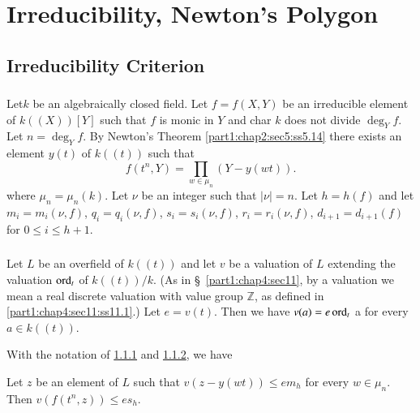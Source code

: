 
\chapter{Irreducibility, Newton's  Polygon}\label{part1:chap5} 

\setcounter{section}{11}
\section{Irreducibility Criterion}\label{part1:chap5:sec12}

\subsection{}\label{part1:chap5:sec12:ss12.1}

Let\pageoriginale $k$ be an algebraically  closed field. Let $f= f(X, Y)$ be an
irreducible element of $k((X))[Y]$ such that $f$ is monic in $Y$ and
char $k$ does not divide $\deg_Y f$. Let $n= \deg_Y f$. By Newton's
Theorem \ref{part1:chap2:sec5:ss5.14} there exists an element $y(t)$
of $k((t))$ such that
$$
f(t^n, Y) = \prod_{w \in \mu_n} (Y- y(wt)).
$$
where $\mu_n= \mu_n (k)$. Let $\nu$ be an integer such that $|\nu|=
n$. Let $h= h(f)$ and let $m_i= m_i(\nu, f)$, $q_i = q_i(\nu, f)$,
$s_i = s_i (\nu, f)$, $r_i = r_i (\nu, f)$, $d_{i+1}= d_{i+1}(f)$ for
$0 \leq i \leq h+1$.

\subsection{}\label{part1:chap5:sec12:ss12.2}

Let $L$ be an overfield of $k((t))$ and let $v$ be a valuation of $L$
extending the valuation $\operatorname{ord}_t$ of $k((t))/k$. (As in
\S\ \ref{part1:chap4:sec11}, by a valuation we mean a real discrete
valuation with value group $\mathbb{Z}$, as defined
in \ref{part1:chap4:sec11:ss11.1}.) Let $e = v(t)$. Then we have
$v(a)= e\operatorname{ord}_t$ a for every $a \in k((t))$.  

With the notation of \ref{part1:chap5:sec12:ss12.1}
and \ref{part1:chap5:sec12:ss12.2}, we have 

\setcounter{thm}{2}
\begin{lemma}\label{part1:chap5:sec12:lem12.3}
  Let $z$ be an element of $L$ such that $v(z-y(wt)) \leq em_h$ for
  every $w \in \mu_n$. Then $v(f(t^n, z))\leq es_h$.
\end{lemma}

